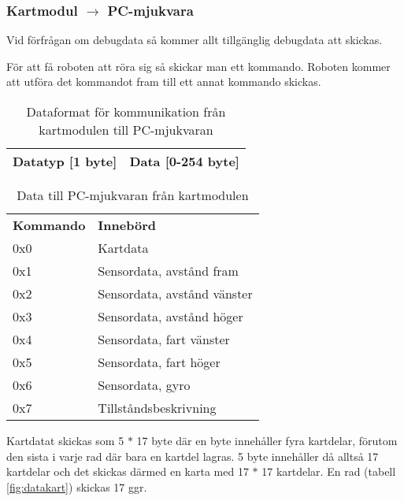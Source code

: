 \subsubsection{Kartmodul $\rightarrow$ PC-mjukvara}
Vid förfrågan om debugdata så kommer allt tillgänglig debugdata att skickas.

För att få roboten att röra sig så skickar man ett kommando. Roboten kommer att
utföra det kommandot fram till ett annat kommando skickas.

\begin{table}[H]
	\caption{Dataformat för kommunikation från kartmodulen till
	PC-mjukvaran}
	\begin{center}
	\begin{tabular}{| c | c |} \hline
		Datatyp [1 byte] & Data [0-254 byte] \\ \hline
	\end{tabular}
	\end{center}
\end{table}

\begin{table}[H]
	\caption{Data till PC-mjukvaran från kartmodulen}
	\begin{tabular}{l l}
		\textbf{Kommando} & \textbf{Innebörd} \\
		0x0	& 	Kartdata \\
		0x1	&	Sensordata, avstånd fram \\
		0x2	&	Sensordata, avstånd vänster \\
		0x3	&	Sensordata, avstånd höger \\
		0x4 	&	Sensordata, fart vänster \\
		0x5	&	Sensordata, fart höger \\
		0x6	&	Sensordata, gyro \\
		0x7	&	Tillståndsbeskrivning \\
	\end{tabular}
\end{table}

Kartdatat skickas som 5 $*$ 17 byte där en byte innehåller fyra kartdelar,
förutom den sista i varje rad där bara en kartdel lagras. 5 byte innehåller då
alltså 17 kartdelar och det skickas därmed en karta med 17 $*$ 17 kartdelar.
En rad (tabell \ref{fig:datakart}) skickas 17 ggr.

